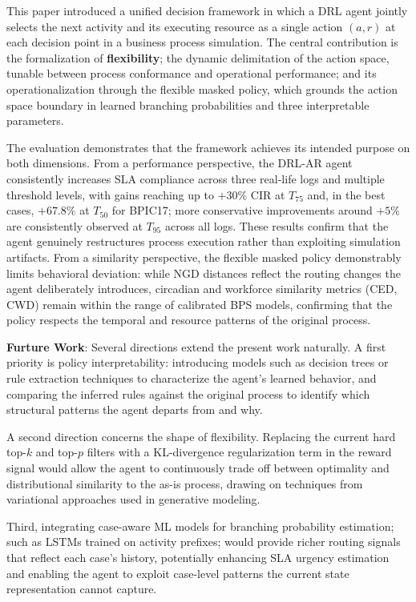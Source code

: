 \documentclass[runningheads]{llncs}
\begin{document}
This paper introduced a unified decision framework in which a DRL agent 
jointly selects the next activity and its executing resource as a single 
action $(a,r)$ at each decision point in a business process simulation. 
The central contribution is the formalization of \textbf{flexibility}; 
the dynamic delimitation of the action space, tunable between process 
conformance and operational performance; and its operationalization 
through the flexible masked policy, which grounds the action space 
boundary in learned branching probabilities and three interpretable 
parameters.

The evaluation demonstrates that the framework achieves its intended 
purpose on both dimensions. From a performance perspective, the DRL-AR 
agent consistently increases SLA compliance across three real-life logs 
and multiple threshold levels, with gains reaching up to $+30\%$ CIR 
at $T_{75}$ and, in the best cases, $+67.8\%$ at $T_{50}$ for BPIC17; 
more conservative improvements around $+5\%$ are consistently observed 
at $T_{95}$ across all logs. These results confirm that the agent 
genuinely restructures process execution rather than exploiting 
simulation artifacts. From a similarity perspective, the flexible masked 
policy demonstrably limits behavioral deviation: while NGD distances 
reflect the routing changes the agent deliberately introduces, circadian 
and workforce similarity metrics (CED, CWD) remain within the range of 
calibrated BPS models, confirming that the policy respects the temporal 
and resource patterns of the original process.

\textbf{Furture Work}: Several directions extend the present work naturally. A first priority 
is policy interpretability: introducing models such as decision trees or 
rule extraction techniques to characterize the agent's learned 
behavior, and comparing the inferred rules against the original process 
to identify which structural patterns the agent departs from and why.

A second direction concerns the shape of flexibility. Replacing the 
current hard top-$k$ and top-$p$ filters with a KL-divergence 
regularization term in the reward signal would allow the agent to 
continuously trade off between optimality and distributional similarity 
to the as-is process, drawing on techniques from variational 
approaches used in generative modeling.

Third, integrating case-aware ML models for branching probability 
estimation; such as LSTMs trained on activity prefixes; would provide 
richer routing signals that reflect each case's history, potentially 
enhancing SLA urgency estimation and enabling the agent to exploit 
case-level patterns the current state representation cannot capture.
\end{document}
